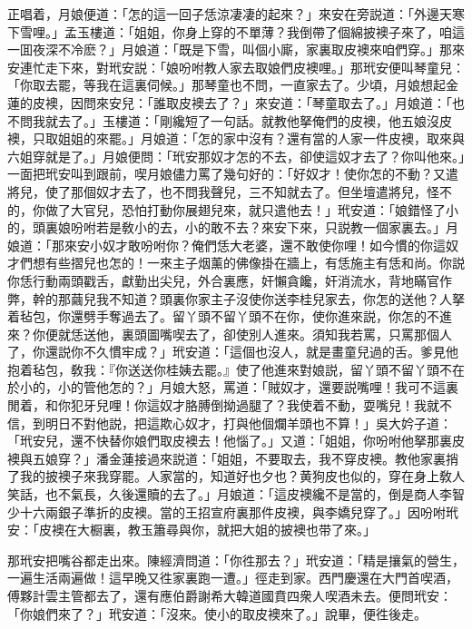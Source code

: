 正唱着，月娘便道：「怎的這一回子恁涼凄凄的起來？」來安在旁説道：「外邊天寒下雪哩。」孟玉樓道：「姐姐，你身上穿的不單薄？我倒帶了個綿披襖子來了，咱這一囬夜深不冷麽？」月娘道：「既是下雪，叫個小廝，家裏取皮襖來咱們穿。」那來安連忙走下來，對玳安説：「娘吩咐教人家去取娘們皮襖哩。」那玳安便叫琴童兒：「你取去罷，等我在這裏伺候。」那琴童也不問，一直家去了。少頃，月娘想起金蓮的皮襖，因問來安兒：「誰取皮襖去了？」來安道：「琴童取去了。」月娘道：「也不問我就去了。」玉樓道：「剛纔短了一句話。就教他拏俺們的皮襖，他五娘沒皮襖，只取姐姐的來罷。」月娘道：「怎的家中沒有？還有當的人家一件皮襖，取來與六姐穿就是了。」月娘便問：「玳安那奴才怎的不去，卻使這奴才去了？你叫他來。」一面把玳安叫到跟前，喫月娘儘力罵了幾句好的：「好奴才！使你怎的不動？又遣將兒，使了那個奴才去了，也不問我聲兒，三不知就去了。但坐壇遣將兒，怪不的，你做了大官兒，恐怕打動你展翅兒來，就只遣他去！」玳安道：「娘錯怪了小的，頭裏娘吩咐若是敎小的去，小的敢不去？來安下來，只説教一個家裏去。」月娘道：「那來安小奴才敢吩咐你？俺們恁大老婆，還不敢使你哩！如今慣的你這奴才們想有些摺兒也怎的！一來主子烟薰的佛像掛在牆上，有恁施主有恁和尚。你説你恁行動兩頭戳舌，獻勤出尖兒，外合裏應，奸懶貪饞，奸消流水，背地瞞官作弊，幹的那繭兒我不知道？頭裏你家主子沒使你送李桂兒家去，你怎的送他？人拏着毡包，你還劈手奪過去了。留丫頭不留丫頭不在你，使你進來説，你怎的不進來？你便就恁送他，裏頭圖嘴喫去了，卻使別人進來。須知我若罵，只罵那個人了，你還説你不久慣牢成？」玳安道：「這個也沒人，就是畫童兒過的舌。爹見他抱着毡包，敎我：『你送送你桂姨去罷。』使了他進來對娘説，留丫頭不留丫頭不在於小的，小的管他怎的？」月娘大怒，罵道：「賊奴才，還要説嘴哩！我可不這裏閒着，和你犯牙兒哩！你這奴才胳膊倒拗過腿了？我使着不動，耍嘴兒！我就不信，到明日不對他説，把這欺心奴才，打與他個爛羊頭也不算！」吳大妗子道：「玳安兒，還不快替你娘們取皮襖去！他惱了。」又道：「姐姐，你吩咐他拏那裏皮襖與五娘穿？」潘金蓮接過來説道：「姐姐，不要取去，我不穿皮襖。教他家裏捎了我的披襖子來我穿罷。人家當的，知道好也夕也？黄狗皮也似的，穿在身上敎人笑話，也不氣長，久後還贖的去了。」月娘道：「這皮襖纔不是當的，倒是商人李智少十六兩銀子準折的皮襖。當的王招宣府裏那件皮襖，與李嬌兒穿了。」因吩咐玳安：「皮襖在大橱裏，教玉簫尋與你，就把大姐的披襖也带了來。」

那玳安把嘴谷都走出來。陳經濟問道：「你徃那去？」玳安道：「精是攘氣的營生，一遍生活兩遍做！這早晚又徃家裏跑一遭。」徑走到家。西門慶還在大門首喫酒，傅夥計雲主管都去了，還有應伯爵謝希大韓道國賁四衆人喫酒未去。便問玳安：「你娘們來了？」玳安道：「沒來。使小的取皮襖來了。」說畢，便徃後走。

